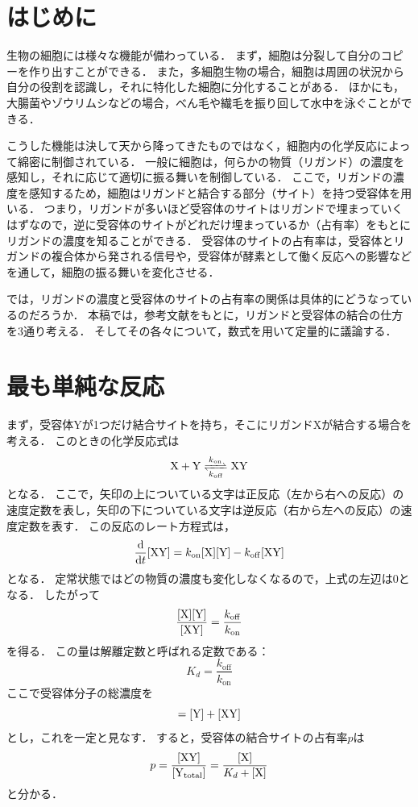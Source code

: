 \section{はじめに}
生物の細胞には様々な機能が備わっている．
まず，細胞は分裂して自分のコピーを作り出すことができる．
また，多細胞生物の場合，細胞は周囲の状況から自分の役割を認識し，それに特化した細胞に分化することがある．
ほかにも，大腸菌やゾウリムシなどの場合，べん毛や繊毛を振り回して水中を泳ぐことができる．

こうした機能は決して天から降ってきたものではなく，細胞内の化学反応によって綿密に制御されている．
一般に細胞は，何らかの物質（リガンド）の濃度を感知し，それに応じて適切に振る舞いを制御している．
ここで，リガンドの濃度を感知するため，細胞はリガンドと結合する部分（サイト）を持つ受容体を用いる．
つまり，リガンドが多いほど受容体のサイトはリガンドで埋まっていくはずなので，逆に受容体のサイトがどれだけ埋まっているか（占有率）をもとにリガンドの濃度を知ることができる．
受容体のサイトの占有率は，受容体とリガンドの複合体から発される信号や，受容体が酵素として働く反応への影響などを通して，細胞の振る舞いを変化させる．

では，リガンドの濃度と受容体のサイトの占有率の関係は具体的にどうなっているのだろうか．
本稿では，参考文献\cite{TBoC}をもとに，リガンドと受容体の結合の仕方を3通り考える．
そしてその各々について，数式を用いて定量的に議論する．

\section{最も単純な反応}
まず，受容体Yが1つだけ結合サイトを持ち，そこにリガンドXが結合する場合を考える．
このときの化学反応式は
\begin{equation}
  \ce{X + Y <=>[$k$_{on}][$k$_{off}] XY}
\end{equation}
となる．
ここで，矢印の上についている文字は正反応（左から右への反応）の速度定数を表し，矢印の下についている文字は逆反応（右から左への反応）の速度定数を表す．
この反応のレート方程式は，
\begin{equation}
  \dv{t}[\ce{XY}] = k_{\mathrm{on}}[\ce{X}][\ce{Y}] - k_{\mathrm{off}}[\ce{XY}]
\end{equation}
となる．
定常状態ではどの物質の濃度も変化しなくなるので，上式の左辺は0となる．
したがって
\begin{equation}
  \frac{[\ce{X}][\ce{Y}]}{[\ce{XY}]} = \frac{k_{\mathrm{off}}}{k_{\mathrm{on}}}
\end{equation}
を得る．
この量は解離定数と呼ばれる定数である：
\begin{equation}
  K_d = \frac{k_{\mathrm{off}}}{k_{\mathrm{on}}}
\end{equation}
ここで受容体分子の総濃度を
\begin{equation}
  [\ce{Y_{total}}] = [\ce{Y}] + [\ce{XY}]
\end{equation}
とし，これを一定と見なす．
すると，受容体の結合サイトの占有率$p$は
\begin{equation}
  p = \frac{[\ce{XY}]}{[\ce{Y_{total}}]} = \frac{[\ce{X}]}{K_d + [\ce{X}]} \label{normal}
\end{equation}
と分かる．

